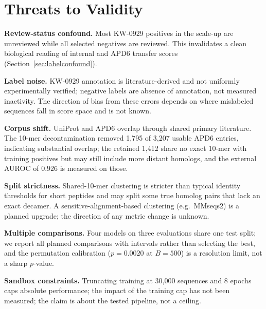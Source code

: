 \section{Threats to Validity}
\textbf{Review-status confound.} Most KW-0929 positives in the scale-up
are unreviewed while all selected negatives are reviewed. This invalidates
a clean biological reading of internal and APD6 transfer scores
(Section~\ref{sec:labelconfound}).

\textbf{Label noise.} KW-0929 annotation is literature-derived and not
uniformly experimentally verified; negative labels are absence of annotation,
not measured inactivity. The direction of bias from these errors depends on where mislabeled
sequences fall in score space and is not known.

\textbf{Corpus shift.} UniProt and APD6 overlap through shared primary
literature. The 10-mer decontamination removed 1{,}795 of 3{,}207 usable APD6
entries, indicating substantial overlap; the retained 1{,}412 share no exact 10-mer with training positives but
may still include more distant homologs, and the external AUROC of $0.926$ is measured on those.

\textbf{Split strictness.} Shared-10-mer clustering is stricter than typical
identity thresholds for short peptides and may split some true homolog pairs
that lack an exact decamer. A sensitive-alignment-based clustering (e.g.\
MMseqs2) is a planned upgrade; the direction of any metric change is unknown.

\textbf{Multiple comparisons.} Four models on three evaluations share one
test split; we report all planned comparisons with intervals rather than
selecting the best, and the permutation calibration ($p=0.0020$ at $B=500$)
is a resolution limit, not a sharp $p$-value.

\textbf{Sandbox constraints.} Truncating training at 30{,}000 sequences and 8
epochs caps absolute performance; the impact of the training cap has not been measured; the claim is about
the tested pipeline, not a ceiling.
